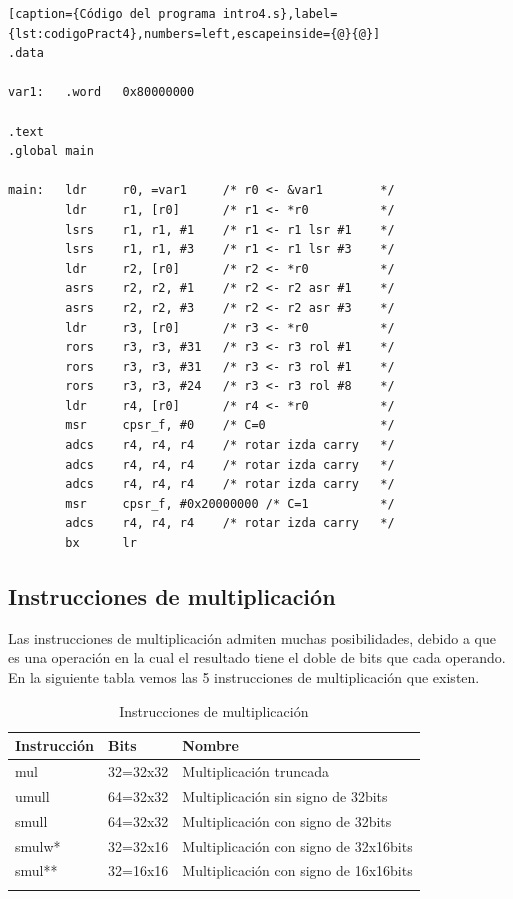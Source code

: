\begin{lstlisting}[caption={Código del programa intro4.s},label={lst:codigoPract4},numbers=left,escapeinside={@}{@}]
.data

var1:   .word   0x80000000

.text
.global main

main:   ldr     r0, =var1     /* r0 <- &var1        */
        ldr     r1, [r0]      /* r1 <- *r0          */
        lsrs    r1, r1, #1    /* r1 <- r1 lsr #1    */
        lsrs    r1, r1, #3    /* r1 <- r1 lsr #3    */
        ldr     r2, [r0]      /* r2 <- *r0          */
        asrs    r2, r2, #1    /* r2 <- r2 asr #1    */
        asrs    r2, r2, #3    /* r2 <- r2 asr #3    */
        ldr     r3, [r0]      /* r3 <- *r0          */
        rors    r3, r3, #31   /* r3 <- r3 rol #1    */
        rors    r3, r3, #31   /* r3 <- r3 rol #1    */
        rors    r3, r3, #24   /* r3 <- r3 rol #8    */
        ldr     r4, [r0]      /* r4 <- *r0          */
        msr     cpsr_f, #0    /* C=0                */
        adcs    r4, r4, r4    /* rotar izda carry   */
        adcs    r4, r4, r4    /* rotar izda carry   */
        adcs    r4, r4, r4    /* rotar izda carry   */
        msr     cpsr_f, #0x20000000 /* C=1          */
        adcs    r4, r4, r4    /* rotar izda carry   */
        bx      lr
\end{lstlisting}

\subsection{Instrucciones de multiplicación}

Las instrucciones de multiplicación admiten muchas posibilidades, debido
a que es una operación en la cual el resultado tiene el doble de bits
que cada operando. En la siguiente tabla vemos las 5 instrucciones de
multiplicación que existen.

\begin{longtable}{| p{2.5cm} | p{2.5cm} | p{7cm} |}
\hline
{\bf Instrucción} & {\bf Bits} & {\bf Nombre} \\ \hline
mul    & 32=32x32 &  Multiplicación truncada \\ \hline
umull  & 64=32x32 & Multiplicación sin signo de 32bits \\ \hline
smull  & 64=32x32 & Multiplicación con signo de 32bits \\ \hline
smulw* & 32=32x16 & Multiplicación con signo de 32x16bits \\ \hline
smul** & 32=16x16 & Multiplicación con signo de 16x16bits \\ \hline
\caption{Instrucciones de multiplicación}
\label{list_mul}
\end{longtable}

